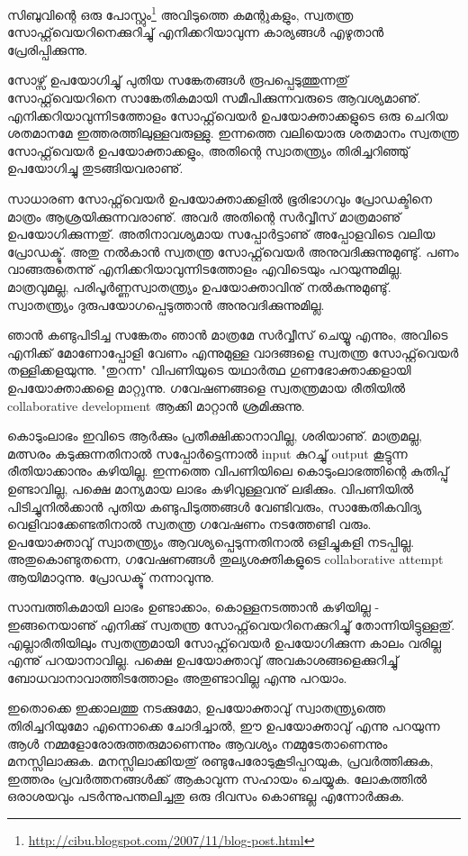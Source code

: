 ﻿
\vskip 2pt

സിബുവിന്റെ ഒരു പോസ്റ്റും\footnote{\url{http://cibu.blogspot.com/2007/11/blog-post.html}} അവിടുത്തെ കമന്റുകളും, സ്വതന്ത്ര സോഫ്റ്റ്‌വെയറിനെക്കുറിച്ചു് എനിക്കറിയാവുന്ന കാര്യങ്ങള്‍ എഴുതാന്‍ പ്രേരിപ്പിക്കുന്നു.

സോഴ്സ് ഉപയോഗിച്ചു് പുതിയ സങ്കേതങ്ങള്‍ രൂപപ്പെടുത്തുന്നതു് സോഫ്റ്റ്‌വെയറിനെ സാങ്കേതികമായി സമീപിക്കുന്നവരുടെ ആവശ്യമാണു്. എനിക്കറിയാവുന്നിടത്തോളം സോഫ്റ്റ്‌വെയര്‍ ഉപയോക്താക്കളുടെ ഒരു ചെറിയ ശതമാനമേ ഇത്തരത്തിലുള്ളവരുള്ളു. ഇന്നത്തെ വലിയൊരു ശതമാനം സ്വതന്ത്ര സോഫ്റ്റ്‌വെയര്‍ ഉപയോക്താക്കളും, അതിന്റെ സ്വാതന്ത്ര്യം തിരിച്ചറിഞ്ഞു് ഉപയോഗിച്ചു തുടങ്ങിയവരാണു്.

സാധാരണ സോഫ്റ്റ്‌വെയര്‍ ഉപയോക്താക്കളില്‍ ഭൂരിഭാഗവും പ്രോഡക്ടിനെ മാത്രം ആശ്രയിക്കുന്നവരാണു്. അവര്‍ അതിന്റെ സര്‍വ്വീസ് മാത്രമാണു് ഉപയോഗിക്കുന്നതു്. അതിനാവശ്യമായ സപ്പോര്‍ട്ടാണു് അപ്പോളവിടെ വലിയ പ്രോഡക്ടു്. അതു നല്‍കാന്‍ സ്വതന്ത്ര സോഫ്റ്റ്‌വെയര്‍ അനുവദിക്കുന്നുമുണ്ടു്. പണം വാങ്ങരുതെന്നു് എനിക്കറിയാവുന്നിടത്തോളം എവിടെയും പറയുന്നുമില്ല. മാത്രവുമല്ല, പരിപൂര്‍ണ്ണസ്വാതന്ത്ര്യം ഉപയോക്താവിനു് നല്‍കുന്നുമുണ്ടു്. സ്വാതന്ത്ര്യം ദുരുപയോഗപ്പെടുത്താന്‍ അനുവദിക്കുന്നുമില്ല.

ഞാന്‍ കണ്ടുപിടിച്ച സങ്കേതം ഞാന്‍ മാത്രമേ സര്‍വ്വീസ് ചെയ്യൂ എന്നും, അവിടെ എനിക്ക് മോണോപ്പോളി വേണം എന്നുമുള്ള വാദങ്ങളെ സ്വതന്ത്ര സോഫ്റ്റ്‌വെയര്‍ തള്ളിക്കളയുന്നു. "തുറന്ന" വിപണിയുടെ യഥാര്‍ത്ഥ ഗുണഭോക്താക്കളായി ഉപയോക്താക്കളെ മാറ്റുന്നു. ഗവേഷണങ്ങളെ സ്വതന്ത്രമായ രീതിയില്‍ collaborative development ആക്കി മാറ്റാന്‍ ശ്രമിക്കുന്നു.

കൊടുംലാഭം ഇവിടെ ആര്‍ക്കും പ്രതീക്ഷിക്കാനാവില്ല, ശരിയാണു്. മാത്രമല്ല, മത്സരം കടുക്കുന്നതിനാല്‍ സപ്പോര്‍ട്ടെന്നാല്‍ input കുറച്ചു് output കൂട്ടുന്ന രീതിയാക്കാനും കഴിയില്ല. ഇന്നത്തെ വിപണിയിലെ കൊടുംലാഭത്തിന്റെ കുതിപ്പു് ഉണ്ടാവില്ല, പക്ഷെ മാന്യമായ ലാഭം കഴിവുള്ളവനു് ലഭിക്കും. വിപണിയില്‍ പിടിച്ചുനില്‍ക്കാന്‍ പുതിയ കണ്ടുപിടുത്തങ്ങള്‍ വേണ്ടിവരും, സാങ്കേതികവിദ്യ വെളിവാക്കേണ്ടതിനാല്‍ സ്വതന്ത്ര ഗവേഷണം നടത്തേണ്ടി വരും. ഉപയോക്താവു് സ്വാതന്ത്ര്യം ആവശ്യപ്പെടുന്നതിനാല്‍ ഒളിച്ചുകളി നടപ്പില്ല. അതുകൊണ്ടുതന്നെ, ഗവേഷണങ്ങള്‍ തുല്യശക്തികളുടെ collaborative attempt ആയിമാറുന്നു. പ്രോഡക്ടു് നന്നാവുന്നു.

സാമ്പത്തികമായി ലാഭം ഉണ്ടാക്കാം, കൊള്ളനടത്താന്‍ കഴിയില്ല - ഇങ്ങനെയാണു് എനിക്കു് സ്വതന്ത്ര സോഫ്റ്റ്‌വെയറിനെക്കുറിച്ചു് തോന്നിയിട്ടുള്ളതു്. എല്ലാരീതിയിലും സ്വതന്ത്രമായി സോഫ്റ്റ്‌‌വെയര്‍ ഉപയോഗിക്കുന്ന കാലം വരില്ല എന്നു് പറയാനാവില്ല. പക്ഷെ ഉപയോക്താവു് അവകാശങ്ങളെക്കുറിച്ചു് ബോധവാനാവാത്തിടത്തോളം അതുണ്ടാവില്ല എന്നു പറയാം.

ഇതൊക്കെ ഇക്കാലത്തു നടക്കുമോ, ഉപയോക്താവു് സ്വാതന്ത്ര്യത്തെ തിരിച്ചറിയുമോ എന്നൊക്കെ ചോദിച്ചാല്‍, ഈ ഉപയോക്താവു് എന്നു പറയുന്ന ആള്‍ നമ്മളോരോരുത്തരുമാണെന്നും ആവശ്യം നമ്മുടേതാണെന്നും മനസ്സിലാക്കുക. മനസ്സിലാക്കിയതു് രണ്ടുപേരോടുകൂടിപ്പറയുക, പ്രവര്‍ത്തിക്കുക, ഇത്തരം പ്രവര്‍ത്തനങ്ങള്‍ക്ക് ആകാവുന്ന സഹായം ചെയ്യുക. ലോകത്തില്‍ ഒരാശയവും പടര്‍ന്നുപന്തലിച്ചതു ഒരു ദിവസം കൊണ്ടല്ല എന്നോര്‍ക്കുക.

